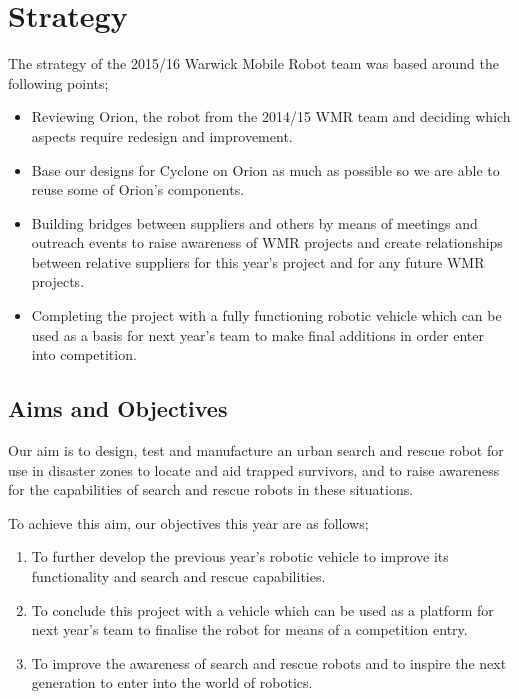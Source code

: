 \section{Strategy}
The strategy of the 2015/16 Warwick Mobile Robot team was based around the following points;
\begin{itemize}
\item{Reviewing Orion, the robot from the 2014/15 WMR team and deciding which aspects require redesign and improvement.}
\item{Base our designs for Cyclone on Orion as much as possible so we are able to reuse some of Orion’s components.}
\item{Building bridges between suppliers and others by means of meetings and outreach events to raise awareness of WMR projects and create relationships between relative suppliers for this year's project and for any future WMR projects.}
\item{Completing the project with a fully functioning robotic vehicle which can be used as a basis for next year’s team to make final additions in order enter into competition.}
\end{itemize}
\subsection{Aims and Objectives}
Our aim is to design, test and manufacture an urban search and rescue robot for use in disaster zones to locate and aid trapped survivors, and to raise awareness for the capabilities of search and rescue robots in these situations. \par
To achieve this aim, our objectives this year are as follows;
\begin{enumerate}
\item{To further develop the previous year’s robotic vehicle to improve its functionality and search and rescue capabilities.}
\item{To conclude this project with a vehicle which can be used as a platform for next year’s team to finalise the robot for means of a competition entry.}
\item{To improve the awareness of search and rescue robots and to inspire the next generation to enter into the world of robotics.}
\end{enumerate} \par
